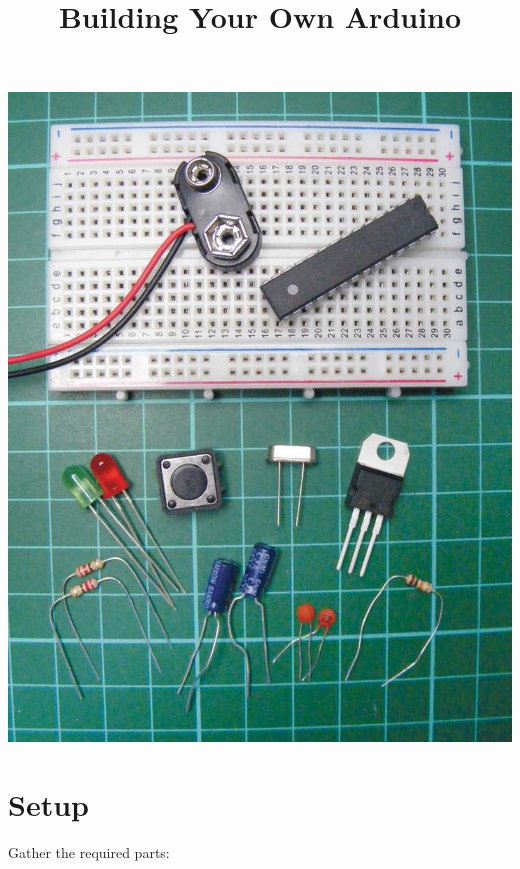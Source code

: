 \documentclass[11pt]{article}
\date{}
\title{Building Your Own Arduino}
\begin{document}
\maketitle

\centerline{
\includegraphics[scale=.55]{figures/cover.png}
}

\section{Setup}
Gather the required parts:
\end{document}
